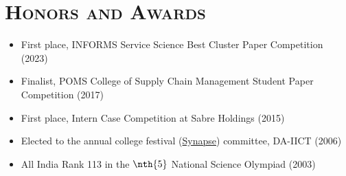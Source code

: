 \documentclass[11pt]{article}
\begin{document}
			\section*{\textbf{\textsc{Honors and Awards } }}
			\begin{itemize}
				\item First place, INFORMS Service Science Best Cluster Paper Competition (2023)
				\item Finalist, POMS  College of Supply Chain Management Student Paper Competition (2017)
				\item First place, Intern Case Competition at Sabre Holdings (2015)





				\item Elected to the annual college festival (\href{http://synapse.daiict.ac.in/}{Synapse}) committee, DA-IICT (2006)
				\item All India Rank 113 in the $\nth{5}$ National Science Olympiad (2003)
			\end{itemize}


		
\end{document}
